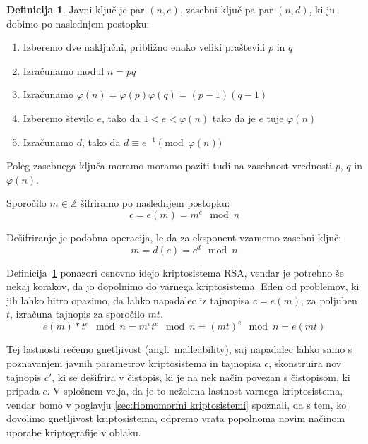 \documentclass[12pt,a4paper,openany,tikz]{book}
\theoremstyle{plain}
\theoremstyle{definition}
\newtheorem{defn}[thm]{Definicija} %
\begin{document}
\begin{mdframed}[frametitle={RSA kriptosistem}]
\begin{minipage}{\textwidth}
  \begin{defn}
    Javni ključ je par $(n, e)$, zasebni ključ pa par $(n, d)$, ki ju dobimo po naslednjem postopku:

    \begin{enumerate}
    \item Izberemo dve naključni, približno enako veliki praštevili $p$ in $q$
    \item Izračunamo modul $n=pq$
    \item Izračunamo $\varphi(n)=\varphi(p)\varphi(q)=(p-1)(q-1)$
    \item Izberemo število $e$, tako da $1<e<\varphi(n)$ tako da je $e$ tuje $\varphi(n)$
    \item Izračunamo $d$, tako da $d \equiv e^{-1} \pmod{\varphi(n)}$
    \end{enumerate}

    Poleg zasebnega ključa moramo moramo paziti tudi na zasebnost vrednosti $p$, $q$ in $\varphi(n)$.

    Sporočilo $m \in \mathbb{Z}$ šifriramo po naslednjem postopku: $$c=e(m)=m^e \mod n$$

    Dešifriranje je podobna operacija, le da za eksponent vzamemo zasebni ključ: $$m=d(c)=c^d \mod n$$
    \label{def:rsa}
  \end{defn}
\end{minipage}
\end{mdframed}

Definicija~\ref{def:rsa} ponazori osnovno idejo kriptosistema RSA, vendar je potrebno še nekaj korakov, da jo dopolnimo do varnega kriptosistema. Eden od problemov, ki jih lahko hitro opazimo, da lahko napadalec iz tajnopisa $c = e(m)$, za poljuben $t$, izračuna tajnopis za sporočilo $mt$.
$$
e(m)*t^e \mod n = m^et^e \mod n = (mt)^e \mod n = e(mt)
$$

Tej lastnosti rečemo gnetljivost (angl.\ malleability), saj napadalec lahko samo s poznavanjem javnih parametrov kriptosistema in tajnopisa $c$, skonstruira nov tajnopis $c'$, ki se dešifrira v čistopis, ki je na nek način povezan s čistopisom, ki pripada $c$. V splošnem velja, da je to neželena lastnost varnega kriptosistema, vendar bomo v poglavju \ref{sec:Homomorfni kriptosistemi} spoznali, da s tem, ko dovolimo gnetljivost kriptosistema, odpremo vrata popolnoma novim načinom uporabe kriptografije v oblaku.
\end{document}
